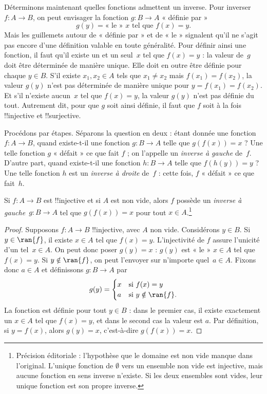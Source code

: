 \documentclass[11pt,a4paper,openany]{memoir}
\begin{document}
\begin{explain}
Déterminons maintenant quelles fonctions admettent un inverse.
Pour inverser $f\colon A \to B$, on peut envisager la fonction
$g\colon B \to A$ « définie par »
\[
g(y) = \text{« le » $x$ tel que $f(x) = y$.}
\]
Mais les guillemets autour de « définie par » et de « le » signalent
qu’il ne s’agit pas encore d’une définition valable en toute généralité.
Pour définir ainsi une fonction, il faut qu’il existe un et un seul~$x$
tel que $f(x) = y$ : la valeur de~$g$ doit être déterminée de manière
unique. Elle doit en outre être définie pour chaque $y \in B$.
S’il existe $x_1,x_2 \in A$ tels que $x_1 \neq x_2$ mais
$f(x_1) = f(x_2)$, la valeur $g(y)$ n’est pas déterminée de manière
unique pour $y = f(x_1) = f(x_2)$. Et s’il n’existe aucun~$x$ tel que
$f(x) = y$, la valeur $g(y)$ n’est pas définie du tout.
Autrement dit, pour que $g$ soit ainsi définie, il faut que $f$ soit
à la fois !!{injective} et !!{surjective}.

Procédons par étapes. Séparons la question en deux : étant donnée une
fonction~$f\colon A \to B$, quand existe-t-il une fonction
$g\colon B \to A$ telle que $g(f(x)) = x$ ? Une telle fonction $g$
« défait » ce que fait $f$ ; on l’appelle un \emph{inverse à gauche}
de~$f$. D’autre part, quand existe-t-il une fonction $h\colon B \to A$
telle que $f(h(y)) = y$ ? Une telle fonction $h$ est un
\emph{inverse à droite} de~$f$ : cette fois, $f$ « défait » ce que fait~$h$.
\end{explain}

\begin{prop}
Si $f\colon A \to B$ est !!{injective} et si $A$ est non vide,
alors $f$ possède un \emph{inverse à gauche}~$g\colon B \to A$ tel que
$g(f(x)) = x$ pour tout $x \in A$.\footnote{Précision éditoriale :
l’hypothèse que le domaine est non vide manque dans l’original.
L’unique fonction de $\emptyset$ vers un ensemble non vide est injective,
mais aucune fonction en sens inverse n’existe. Si les deux ensembles
sont vides, leur unique fonction est son propre inverse.}
\end{prop}

\begin{proof}
Supposons $f\colon A \to B$ !!{injective}, avec $A$ non vide.
Considérons $y \in B$. Si $y \in \ran{f}$, il existe $x \in A$ tel que
$f(x) = y$. L’injectivité de $f$ assure l’unicité d’un tel~$x \in A$.
On peut donc poser $g(y) = x$ : $g(y)$ est « le » $x \in A$ tel que
$f(x) = y$. Si $y \notin \ran{f}$, on peut l’envoyer sur n’importe
quel~$a \in A$. Fixons donc $a \in A$ et définissons $g\colon B \to A$ par
\[
g(y) = \begin{cases}
    x & \text{si $f(x) = y$}\\
    a & \text{si $y \notin \ran{f}$.}
\end{cases}
\]
La fonction est définie pour tout $y \in B$ : dans le premier cas,
il existe exactement un $x \in A$ tel que $f(x) = y$, et dans le second
cas la valeur est $a$. Par définition, si $y = f(x)$, alors $g(y) = x$,
c’est-à-dire $g(f(x)) = x$.
\end{proof}
\end{document}
